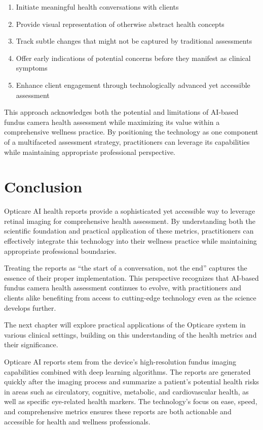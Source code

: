 \documentclass[
  Letterpaper,
]{scrbook}
\providecommand{\tightlist}{%
  \setlength{\itemsep}{0pt}\setlength{\parskip}{0pt}}\usepackage{longtable,booktabs,array}
\begin{document}
\begin{enumerate}
\def\labelenumi{\arabic{enumi}.}
\tightlist
\item
  Initiate meaningful health conversations with clients
\item
  Provide visual representation of otherwise abstract health concepts
\item
  Track subtle changes that might not be captured by traditional
  assessments
\item
  Offer early indications of potential concerns before they manifest as
  clinical symptoms
\item
  Enhance client engagement through technologically advanced yet
  accessible assessment
\end{enumerate}

This approach acknowledges both the potential and limitations of
AI-based fundus camera health assessment while maximizing its value
within a comprehensive wellness practice. By positioning the technology
as one component of a multifaceted assessment strategy, practitioners
can leverage its capabilities while maintaining appropriate professional
perspective.

\section{Conclusion}\label{conclusion}

Opticare AI health reports provide a sophisticated yet accessible way to
leverage retinal imaging for comprehensive health assessment. By
understanding both the scientific foundation and practical application
of these metrics, practitioners can effectively integrate this
technology into their wellness practice while maintaining appropriate
professional boundaries.

Treating the reports as ``the start of a conversation, not the end''
captures the essence of their proper implementation. This perspective
recognizes that AI-based fundus camera health assessment continues to
evolve, with practitioners and clients alike benefiting from access to
cutting-edge technology even as the science develops further.

The next chapter will explore practical applications of the Opticare
system in various clinical settings, building on this understanding of
the health metrics and their significance.

Opticare AI reports stem from the device's high-resolution fundus
imaging capabilities combined with deep learning algorithms. The reports
are generated quickly after the imaging process and summarize a
patient's potential health risks in areas such as circulatory,
cognitive, metabolic, and cardiovascular health, as well as specific
eye-related health markers. The technology's focus on ease, speed, and
comprehensive metrics ensures these reports are both actionable and
accessible for health and wellness professionals.
\end{document}
